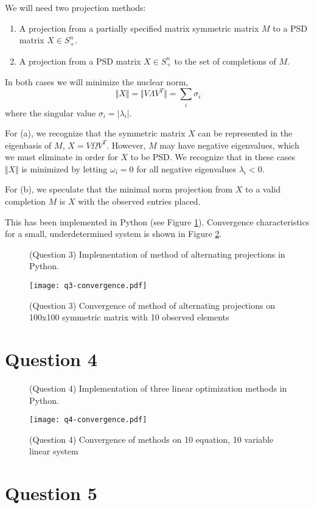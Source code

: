 \documentclass{article}
\begin{document}
We will need two projection methods:

\begin{enumerate}
\item A projection from a partially specified matrix symmetric matrix $M$
  to a PSD matrix $X \in S_+^n$.
\item A projection from a PSD matrix $X \in S_+^n$ to the set of
  completions of $M$.
\end{enumerate}

In both cases we will minimize the nuclear norm,
\[ \Vert X \Vert = \Vert V \Lambda V^T \Vert = \sum_i \sigma_i \]
where the singular value $\sigma_i = \vert \lambda_i \vert$.

For (a), we recognize that the symmetric matrix $X$ can be represented
in the eigenbasis of $M$, $X = V \Omega V^T$. However, $M$ may have
negative eigenvalues, which we must eliminate in order for $X$ to be
PSD. We recognize that in these cases $\Vert X \Vert$ is minimized by
letting $\omega_i = 0$ for all negative eigenvalues $\lambda_i <
0$.

For (b), we speculate that the minimal norm projection from $X$ to a
valid completion $M$ is $X$ with the observed entries placed.

This has been implemented in Python (see Figure
\ref{Fig:AltProj}). Convergence characteristics for a small,
underdetermined system is shown in Figure \ref{Fig:AltProjConv}.

\begin{figure}
  
  \caption{(Question 3) Implementation of method of alternating projections in Python.}
  \label{Fig:AltProj}
\end{figure}

\begin{figure}
  \center
  \texttt{[image: q3-convergence.pdf]}
  \caption{(Question 3) Convergence of method of alternating projections on 100x100
  symmetric matrix with 10 observed elements}
  \label{Fig:AltProjConv}
\end{figure}

\section{Question 4}

\begin{figure}
  
  \caption{(Question 4) Implementation of three linear optimization methods in Python.}
  \label{Fig:Q4}
\end{figure}

\begin{figure}
  \center
  \texttt{[image: q4-convergence.pdf]}
  \caption{(Question 4) Convergence of methods on 10 equation, 10 variable linear system}
  \label{Fig:Q4Convergence}
\end{figure}



\section{Question 5}


\end{document}
